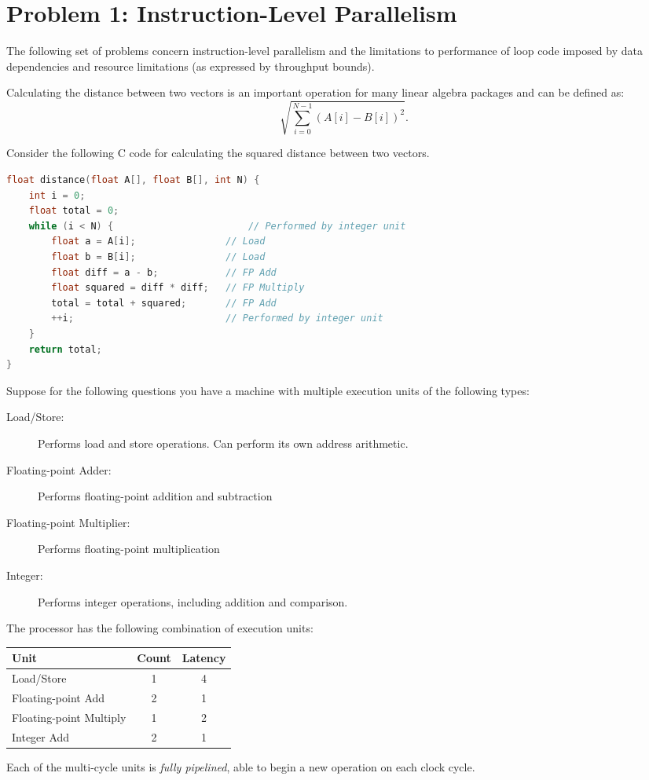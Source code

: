 \documentclass[11pt]{article}
\begin{document}
\section*{Problem 1: Instruction-Level Parallelism}

The following set of problems concern instruction-level parallelism
and the limitations to performance of loop code imposed by data
dependencies and resource limitations (as expressed by throughput bounds).

Calculating the distance between two vectors is an important operation for many
linear algebra packages and can be defined as:
\begin{displaymath}
\sqrt{\sum_{i=0}^{N-1}\left ( A\left [ i \right ]-B\left [ i \right ] \right )^{2}}.
\end{displaymath}

\newpage
Consider the following C code for calculating the squared distance 
between two vectors.

\begin{lstlisting}[language=C]
float distance(float A[], float B[], int N) {
	int i = 0;
	float total = 0;
	while (i < N) {                        // Performed by integer unit
		float a = A[i];                // Load
		float b = B[i];                // Load
		float diff = a - b;            // FP Add
		float squared = diff * diff;   // FP Multiply
		total = total + squared;       // FP Add
		++i;                           // Performed by integer unit
	}
	return total;
}
\end{lstlisting}


Suppose for the following questions you have a machine with multiple execution units of the following types:
\begin{description}
\item[Load/Store:] Performs load and store operations.  Can perform its own address arithmetic.
\item[Floating-point Adder:] Performs floating-point addition and subtraction
\item[Floating-point Multiplier:] Performs floating-point multiplication
\item[Integer:] Performs integer operations, including addition and comparison.
\end{description}

The processor has the following combination of execution units:
\begin{center}
\begin{tabular}{|l|c|c|}
\hline
\textbf{Unit}           & \textbf{Count} & \textbf{Latency} \\ \hline
Load/Store              & 1              & 4                \\ \hline
Floating-point Add      & 2              & 1                \\ \hline
Floating-point Multiply & 1              & 2                \\ \hline
Integer Add             & 2              & 1                \\ \hline
\end{tabular}
\end{center}
Each of the multi-cycle units is {\em fully pipelined}, able to begin a new operation on each clock cycle.
\end{document}
